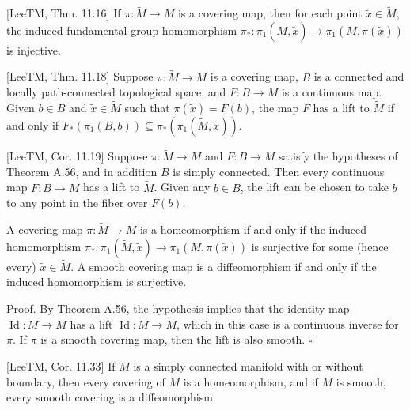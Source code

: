 \begin{theorem}
\label{thm:injectivity-theorem}
[LeeTM, Thm. 11.16] If $\pi: \tilde{M} \to M$ is a covering map, then for each point $\tilde{x} \in \tilde{M}$, the induced fundamental group homomorphism $\pi_*: \pi_1(\tilde{M}, \tilde{x}) \to \pi_1(M, \pi(\tilde{x}))$ is injective.
\end{theorem}

\begin{theorem}
\label{thm:lifting-criterion}
[LeeTM, Thm. 11.18] Suppose $\pi: \tilde{M} \to M$ is a covering map, $B$ is a connected and locally path-connected topological space, and $F: B \to M$ is a continuous map. Given $b \in B$ and $\tilde{x} \in \tilde{M}$ such that $\pi(\tilde{x}) = F(b)$, the map $F$ has a lift to $\tilde{M}$ if and only if $F_*(\pi_1(B,b)) \subseteq \pi_*(\pi_1(\tilde{M}, \tilde{x}))$.
\end{theorem}

\begin{corollary}
\label{cor:lifting-maps-simply-connected}
[LeeTM, Cor. 11.19] Suppose $\pi: \tilde{M} \to M$ and $F: B \to M$ satisfy the hypotheses of Theorem A.56, and in addition $B$ is simply connected. Then every continuous map $F: B \to M$ has a lift to $\tilde{M}$. Given any $b \in B$, the lift can be chosen to take $b$ to any point in the fiber over $F(b)$.
\end{corollary}

\begin{corollary}
\label{cor:covering-map-homeomorphism}
A covering map $\pi: \tilde{M} \to M$ is a homeomorphism if and only if the induced homomorphism $\pi_*: \pi_1(\tilde{M}, \tilde{x}) \to \pi_1(M, \pi(\tilde{x}))$ is surjective for some (hence every) $\tilde{x} \in \tilde{M}$. A smooth covering map is a diffeomorphism if and only if the induced homomorphism is surjective.

Proof. By Theorem A.56, the hypothesis implies that the identity map $\operatorname{Id}: M \to M$ has a lift $\widetilde{\operatorname{Id}}: \tilde{M} \to \tilde{M}$, which in this case is a continuous inverse for $\pi$. If $\pi$ is a smooth covering map, then the lift is also smooth. $\square$
\end{corollary}

\begin{corollary}
\label{cor:coverings-simply-connected}
[LeeTM, Cor. 11.33] If $M$ is a simply connected manifold with or without boundary, then every covering of $M$ is a homeomorphism, and if $M$ is smooth, every smooth covering is a diffeomorphism.
\end{corollary}

